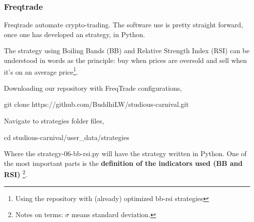 \documentclass[
12pt,				%
openright,			%
oneside,			%
a4paper,			%
brazil,				%
english,			%
]{abntex2}
\begin{document}




\subsubsection{Freqtrade}

Freqtrade automate crypto-trading. The software use is pretty straight
forward, once one has developed an strategy, in Python.

The strategy using Boiling Bands (BB) and Relative Strength Index
(RSI) can be understood in words as the principle: buy when prices are
oversold and sell when it's on an average price\footnote{Using the repository with (already) optimized bb-rsi strategies}.

Downloading our repository with FreqTrade configurations,
\begin{shell}
git clone https://github.com/BuddhiLW/studious-carnival.git
\end{shell}

Navigate to strategies folder files,
\begin{shell}
cd studious-carnival/user_data/strategies
\end{shell}

Where the strategy-06-bb-rsi.py will have the strategy written in Python. One of the most important parts is the \textbf{definition of the indicators used (BB and RSI)} \footnote{Notes on terms: $\sigma$ means standard deviation.}.
\end{document}
